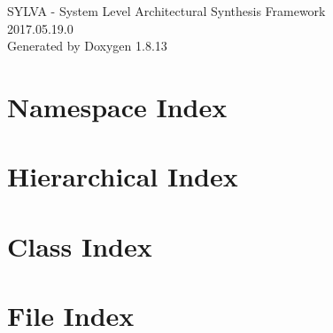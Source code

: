 \documentclass[twoside]{book}
\newcommand{\+}{\discretionary{\mbox{\scriptsize$\hookleftarrow$}}{}{}}
\newcommand{\clearemptydoublepage}{%
  \newpage{\pagestyle{empty}\cleardoublepage}%
}
\begin{document}
\hypersetup{pageanchor=false,
             bookmarksnumbered=true,
             pdfencoding=unicode
            }
\begin{titlepage}
\vspace*{7cm}
\begin{center}%
{\Large S\+Y\+L\+VA -\/ System Level Architectural Synthesis Framework \\[1ex]\large 2017.\+05.\+19.\+0 }\\
\vspace*{1cm}
{\large Generated by Doxygen 1.8.13}\\
\end{center}
\end{titlepage}
\clearemptydoublepage
{}
\tableofcontents
\clearemptydoublepage
{}
\hypersetup{pageanchor=true}

\chapter{Namespace Index}

\chapter{Hierarchical Index}

\chapter{Class Index}

\chapter{File Index}

\end{document}

